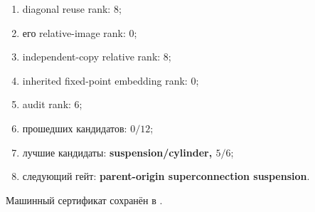 \begin{protocol}\begin{enumerate}
\item diagonal reuse rank: \textbf{$8$};
\item его relative-image rank: \textbf{$0$};
\item independent-copy relative rank: \textbf{$8$};
\item inherited fixed-point embedding rank: \textbf{$0$};
\item audit rank: \textbf{$6$};
\item прошедших кандидатов: \textbf{$0/12$};
\item лучшие кандидаты: \textbf{suspension/cylinder, $5/6$};
\item следующий гейт: \textbf{parent-origin superconnection suspension}.
\end{enumerate}\end{protocol}

Машинный сертификат сохранён в
.